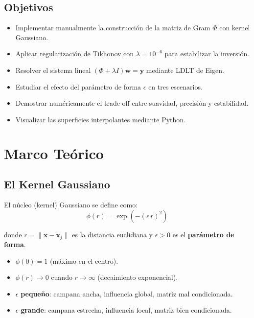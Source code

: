 \documentclass[12pt,a4paper]{article}
\theoremstyle{definition}
\newcommand{\norm}[1]{\|#1\|}
\newcommand{\vect}[1]{\mathbf{#1}}
\begin{document}
\subsection{Objetivos}
\begin{itemize}
    \item Implementar manualmente la construcci\'{o}n de la matriz de Gram $\Phi$ con kernel Gaussiano.
    \item Aplicar regularizaci\'{o}n de Tikhonov con $\lambda = 10^{-6}$ para estabilizar la inversi\'{o}n.
    \item Resolver el sistema lineal $(\Phi + \lambda I)\vect{w} = \vect{y}$ mediante LDLT de Eigen.
    \item Estudiar el efecto del par\'{a}metro de forma $\epsilon$ en tres escenarios.
    \item Demostrar num\'{e}ricamente el trade-off entre suavidad, precisi\'{o}n y estabilidad.
    \item Visualizar las superficies interpolantes mediante Python.
\end{itemize}

\section{Marco Te\'{o}rico}\label{sec:teoria}

\subsection{El Kernel Gaussiano}

El n\'{u}cleo (kernel) Gaussiano se define como:
\begin{equation}\label{eq:kernel}
\phi(r) = \exp\!\left(-(\epsilon \, r)^2\right)
\end{equation}

donde $r = \norm{\vect{x} - \vect{x}_j}$ es la distancia euclidiana y $\epsilon > 0$ es el \textbf{par\'{a}metro de forma}.

\begin{itemize}
    \item $\phi(0) = 1$ (m\'{a}ximo en el centro).
    \item $\phi(r) \to 0$ cuando $r \to \infty$ (decaimiento exponencial).
    \item $\epsilon$ \textbf{peque\~{n}o}: campana ancha, influencia global, matriz mal condicionada.
    \item $\epsilon$ \textbf{grande}: campana estrecha, influencia local, matriz bien condicionada.
\end{itemize}
\end{document}
